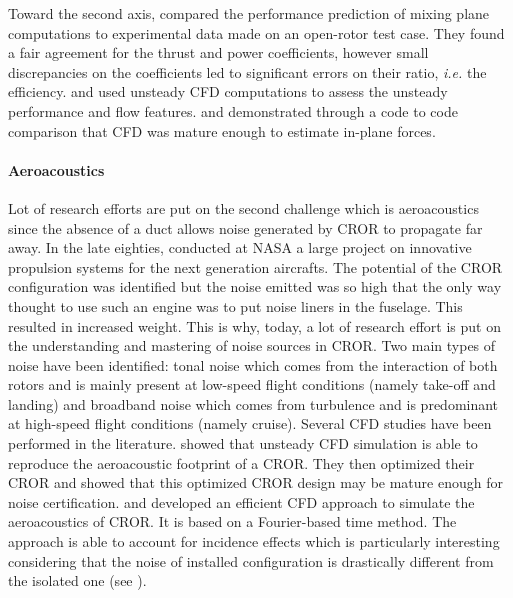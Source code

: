 Toward the second axis, \citet{Zachariadis2011}
compared the performance prediction of mixing plane computations
to experimental data made on an open-rotor test case.
They found a fair agreement for the thrust and power coefficients, however
small discrepancies on the coefficients led to significant errors on their ratio,
\emph{i.e.} the efficiency.
\citet{Vion2011} and \citet{Stuermer2008} used unsteady
CFD computations to assess the unsteady performance and flow features.
\citet{Stuermer2008} and \citet{Francois2013} demonstrated through a code to code comparison
that CFD was mature enough to estimate in-plane forces.

\paragraph{Aeroacoustics}
Lot of research efforts are put on the second challenge which
is aeroacoustics since the absence of a duct allows noise generated
by CROR to propagate far away.
In the late eighties, \citet{Hager1988}
conducted at NASA a large project on innovative propulsion systems for the
next generation aircrafts. The potential of the CROR configuration
was identified but the noise emitted was so high that the only way
thought to use such an engine was to put noise liners in the fuselage. This resulted in 
increased weight. This is why, today, a lot of research effort is put on the
understanding and mastering of noise sources in CROR.
Two main types of noise have been identified: tonal noise which comes from
the interaction of both rotors and is mainly present at low-speed flight conditions 
(namely take-off and landing)
and broadband noise which comes from turbulence and is predominant
at high-speed flight conditions (namely cruise).
Several CFD studies have been performed in the literature.
\citet{Peters2012} showed that unsteady CFD simulation is able
to reproduce the aeroacoustic footprint of a CROR. They then optimized
their CROR and showed that this optimized CROR design may be mature enough
for noise certification. \citet{Hoffer2012} and \citet{Ferrante2013}
developed an efficient CFD approach to simulate the aeroacoustics of CROR.
It is based on a Fourier-based time method. The approach is able to
account for incidence effects which is particularly interesting
considering that the noise of installed configuration is drastically
different from the isolated one (see \citet{Hager1988}).

